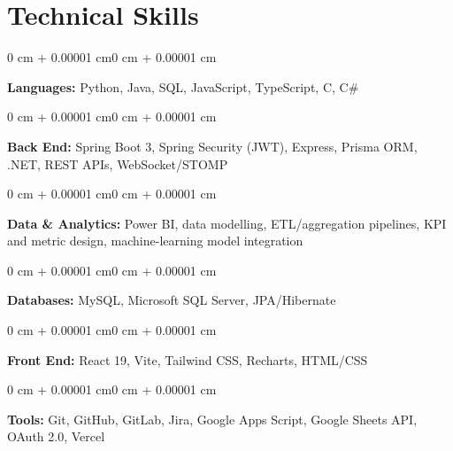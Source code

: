 \documentclass[10pt, letterpaper]{article}
\newenvironment{onecolentry}{
    \begin{adjustwidth}{0 cm + 0.00001 cm}{0 cm + 0.00001 cm}
}{
    \end{adjustwidth}
}
\begin{document}
\section{Technical Skills}

\begin{onecolentry}
    \textbf{Languages:} Python, Java, SQL, JavaScript, TypeScript, C, C\#
\end{onecolentry}

\vspace{0.15 cm}

\begin{onecolentry}
    \textbf{Back End:} Spring Boot 3, Spring Security (JWT), Express, Prisma ORM, .NET,
    REST APIs, WebSocket/STOMP
\end{onecolentry}

\vspace{0.15 cm}

\begin{onecolentry}
    \textbf{Data \& Analytics:} Power BI, data modelling, ETL/aggregation pipelines,
    KPI and metric design, machine-learning model integration
\end{onecolentry}

\vspace{0.15 cm}

\begin{onecolentry}
    \textbf{Databases:} MySQL, Microsoft SQL Server, JPA/Hibernate
\end{onecolentry}

\vspace{0.15 cm}

\begin{onecolentry}
    \textbf{Front End:} React 19, Vite, Tailwind CSS, Recharts, HTML/CSS
\end{onecolentry}

\vspace{0.15 cm}

\begin{onecolentry}
    \textbf{Tools:} Git, GitHub, GitLab, Jira, Google Apps Script, Google Sheets API,
    OAuth 2.0, Vercel
\end{onecolentry}

\end{document}
